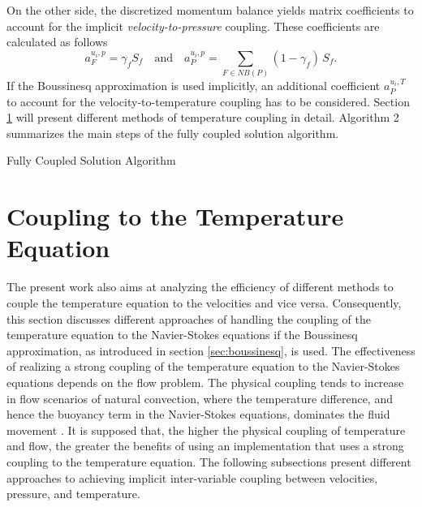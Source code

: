 On the other side, the discretized momentum balance yields matrix coefficients to account for the implicit \emph{velocity-to-pressure} coupling. These coefficients are calculated as follows
\begin{displaymath}
  a_F^{u_i,p} =  \gamma_f S_f \quad \text{and} \quad a_P^{u_i,p} = \sum_{F \in NB(P)} (1-\gamma_f) \, S_f.
\end{displaymath}
If the Boussinesq approximation is used implicitly, an additional coefficient \(a_P^{u_i,T}\) to account for the velocity-to-temperature coupling has to be considered. Section \ref{sec:temperaturecoupling} will present different methods of temperature coupling in detail. Algorithm 2 summarizes the main steps of the fully coupled solution algorithm.

\begin{algorithm}
\label{al:coupled}
\caption{Fully Coupled Solution Algorithm}
\begin{algorithmic}
\Else
\EndIf
{}
\EndIf
\EndWhile
{}
\EndIf
\end{algorithmic}
\end{algorithm}

\section{Coupling to the Temperature Equation}
\label{sec:temperaturecoupling}

The present work also aims at analyzing the efficiency of different methods to couple the temperature equation to the velocities and vice versa. Consequently, this section discusses different approaches of handling the coupling of the temperature equation to the Navier-Stokes equations if the Boussinesq approximation, as introduced in section \ref{sec:boussinesq}, is used. The effectiveness of realizing a strong coupling of the temperature equation to the Navier-Stokes equations depends on the flow problem. The physical coupling tends to increase in flow scenarios of natural convection, where the temperature difference, and hence the buoyancy term in the Navier-Stokes equations, dominates the fluid movement \cite{ferziger02,vakilipour12}. It is supposed that, the higher the physical coupling of temperature and flow, the greater the benefits of using an implementation that uses a strong coupling to the temperature equation. The following subsections present different approaches to achieving implicit inter-variable coupling between velocities, pressure, and temperature.
      
